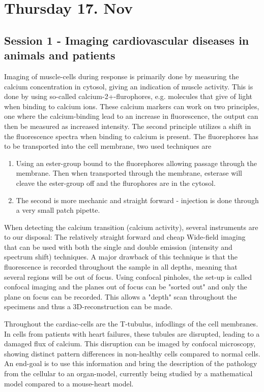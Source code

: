 \documentclass[12p]{article}
\begin{document}
\section*{Thursday 17. Nov}

\subsection*{Session 1 - Imaging cardiovascular diseases in animals and patients}

Imaging of muscle-cells during response is primarily done by measuring the calcium concentration in cytosol, giving an indication of muscle activity.
This is done by using so-called calcium-2+-flurophores, e.g. molecules that give of light when binding to calcium ions.
These calcium markers can work on two principles, one where the calcium-binding lead to an increase in fluorescence, the output can then be measured as increased intensity.
The second principle utilizes a shift in the fluorescence spectra when binding to calcium is present.
The fluorephores has to be transported into the cell membrane, two used techniques are 

\begin{enumerate}
\item
Using an ester-group bound to the fluorephores allowing passage through the membrane.
Then when transported through the membrane, esterase will cleave the ester-group off and the flurophores are in the cytosol.
\item
The second is more mechanic and straight forward - injection is done through a very small patch pipette.
\end{enumerate}

When detecting the calcium transition (calcium activity), several instruments are to our disposal: 
The relatively straight forward and cheap Wide-field imaging that can be used with both the single and double emission (intensity and spectrum shift) techniques. 
A major drawback of this technique is that the fluorescence is recorded throughout the sample in all depths, meaning that several regions will be out of focus.
Using confocal pinholes, the set-up is called confocal imaging and the planes out of focus can be "sorted out" and only the plane on focus can be recorded.
This allows a "depth" scan throughout the specimens and thus a 3D-reconstruction can be made.

Throughout the cardiac-cells are the T-tubulus, infodlings of the cell membranes.
In cells from patients with heart failures, these tubules are disrupted, leading to a damaged flux of calcium.
This disruption can be imaged by confocal microscopy, showing distinct pattern differences in non-healthy cells compared to normal cells.
An end-goal is to use this information and bring the description of the pathology from the cellular to an organ-model, currently being studied by a mathematical model compared to a mouse-heart model.
\end{document}
